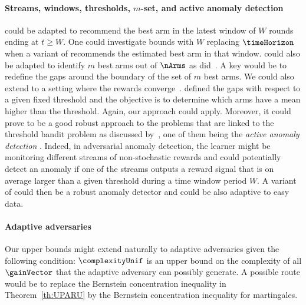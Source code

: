 \paragraph{Streams, windows, thresholds, $m$-set, and active 
	anomaly detection}
\Pone{} could be adapted to
recommend  the  best arm in 
the latest window of $W$ rounds
ending at $t\geq W$. One could investigate bounds with $W$ replacing $\timeHorizon$ when a variant of \Pone{} recommends the estimated best arm in that window. \Pone{} could also be adapted to identify $m$ best arms out of $\nArms$ as did~\cite{Bubeck12MI}.
A key would be to redefine the gaps around the boundary of the set of $m$ best arms.
We could also extend \Pone{} to a setting where the rewards converge~\citep{Li16HA}.
\cite{Locatelli16AO} defined the gaps with respect 
to a given fixed threshold and the objective is to determine which arms have 
a mean higher than the threshold. Again, our approach could apply. Moreover, it could prove to be a good 
robust approach to the problems that are linked to the 
threshold bandit problem as discussed by~\citet[Section~3]{Locatelli16AO}, one of them being the \emph{active anomaly detection} \citep{carpentier2014extreme}. %
Indeed, in adversarial anomaly detection, the learner might be monitoring 
different streams of non-stochastic rewards and could potentially detect an 
anomaly if one of the streams outputs a reward signal that is on average larger
than a given threshold during a time window period $W.$ A variant of \Pone{} could then be a robust anomaly detector and could be also adaptive to easy data.
%
\paragraph{Adaptive adversaries} Our upper bounds might extend 
naturally  to adaptive adversaries given the following condition:  
$\complexityUnif$ is an upper bound on the complexity of 
all $\gainVector$ that the adaptive adversary can possibly generate. A possible route would be to replace the Bernstein concentration inequality in Theorem~\ref{th:UPARU} by the Bernstein concentration inequality for martingales.
\vfil
